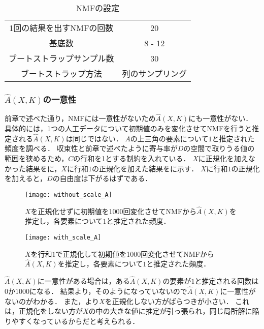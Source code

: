 \begin{table}[htb]
  \center
  \begin{tabular}{c|c} \hline
		1回の結果を出すNMFの回数 & 20 \\
		基底数 & 8 - 12 \\
		ブートストラップサンプル数 & 30 \\
		ブートストラップ方法 & 列のサンプリング \\ \hline
  \end{tabular}
  \caption{NMFの設定}
  \label{tab:exp1param2}
\end{table}

\subsubsection{$\hat{A}(X,K)$の一意性}
前章で述べた通り，NMFには一意性がないため$\hat{A}(X,K)$にも一意性がない．
具体的には，1つの人工データについて初期値のみを変化させてNMFを行うと推定される$\hat{A}(X,K)$は同じではない．
$A$の上三角の要素について$1$と推定された頻度を調べる．
収束性と前章で述べたように寄与率が$D$の空間で取りうる値の範囲を狭めるため，$C$の行和を1とする制約を入れている．
$X$に正規化を加えなかった結果をに，$X$に行和$1$の正規化を加えた結果をに示す．
$X$に行和$1$の正規化を加えると，$D$の自由度は下がるはずである．

\begin{figure}[htbp]
    \begin{minipage}{0.5\hsize}
			\begin{center}
					\texttt{[image: without\_scale\_A]}
					\caption{$X$を正規化せずに初期値を1000回変化させてNMFから$\hat{A}(X,K)$を推定し，各要素について$1$と推定された頻度．}
					\label{fig:without_scale_A}
			\end{center}
		\end{minipage}
    \begin{minipage}{0.5\hsize}
			\begin{center}
					\texttt{[image: with\_scale\_A]}
					\caption{$X$を行和$1$で正規化して初期値を1000回変化させてNMFから$\hat{A}(X,K)$を推定し，各要素について$1$と推定された頻度．}
					\label{fig:with_scale_A}
			\end{center}
		\end{minipage}
\end{figure}

$\hat{A}(X,K)$に一意性がある場合は，ある$\hat{A}(X,K)$の要素が$1$と推定される回数は$0$か$1000$になる．
結果より，そのようになっていないので$\hat{A}(X,K)$に一意性がないのがわかる．
また，より$X$を正規化しない方がばらつきが小さい．
これは，正規化をしない方が$X$の中の大きな値に推定が引っ張られ，同じ局所解に陥りやすくなっているからだと考えられる．

